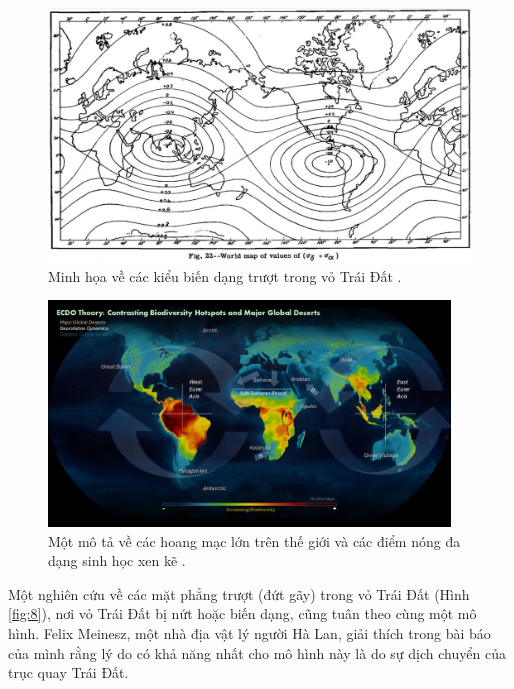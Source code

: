 \documentclass[10pt,twocolumn,letterpaper]{article}
\begin{document}
\begin{figure}[t]
\begin{center}
   \includegraphics[width=1\linewidth]{meinesz3.jpg}
\end{center}
   \caption{Minh họa về các kiểu biến dạng trượt trong vỏ Trái Đất \cite{36}.}
\label{fig:8}
\label{fig:onecol}
\end{figure}
\begin{figure}[t]
\begin{center}
\includegraphics[width=0.95\textwidth]{biodiversity.jpg}
\end{center}
   \caption{Một mô tả về các hoang mạc lớn trên thế giới và các điểm nóng đa dạng sinh học xen kẽ \cite{28}.}
\label{fig:9}
\end{figure}

Một nghiên cứu về các mặt phẳng trượt (đứt gãy) trong vỏ Trái Đất (Hình \ref{fig:8}), nơi vỏ Trái Đất bị nứt hoặc biến dạng, cũng tuân theo cùng một mô hình. Felix Meinesz, một nhà địa vật lý người Hà Lan, giải thích trong bài báo của mình \cite{36} rằng lý do có khả năng nhất cho mô hình này là do sự dịch chuyển của trục quay Trái Đất.
\end{document}
